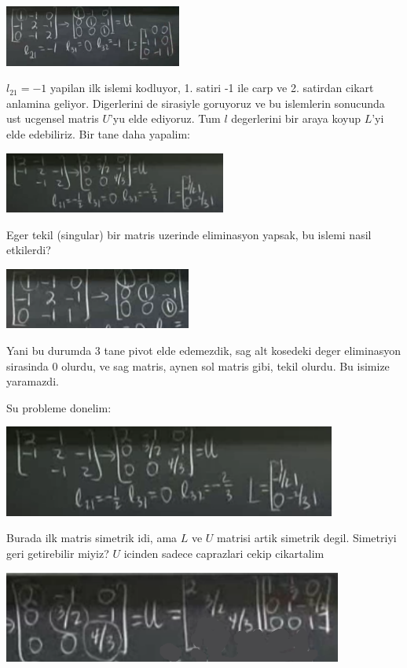 \documentclass[12pt,fleqn]{article}
\begin{document}
\includegraphics[height=2cm]{3_3.png}

$l_{21} = -1$ yapilan ilk islemi kodluyor, 1. satiri -1 ile carp ve
2. satirdan cikart anlamina geliyor. Digerlerini de sirasiyle goruyoruz ve
bu islemlerin sonucunda ust ucgensel matris $U$'yu elde ediyoruz. Tum $l$
degerlerini bir araya koyup $L$'yi elde edebiliriz. Bir tane daha yapalim:

\includegraphics[height=2cm]{3_4.png}

Eger tekil (singular) bir matris uzerinde eliminasyon yapsak, bu islemi
nasil etkilerdi? 

\includegraphics[height=2cm]{3_5.png}

Yani bu durumda 3 tane pivot elde edemezdik, sag alt kosedeki deger
eliminasyon sirasinda 0 olurdu, ve sag matris, aynen sol matris gibi, tekil
olurdu. Bu isimize yaramazdi. 

Su probleme donelim: 

\includegraphics[height=3cm]{3_4.png}

Burada ilk matris simetrik idi, ama $L$ ve $U$ matrisi artik simetrik
degil. Simetriyi geri getirebilir miyiz? $U$ icinden sadece caprazlari
cekip cikartalim

\includegraphics[height=3cm]{3_6.png}
\end{document}
